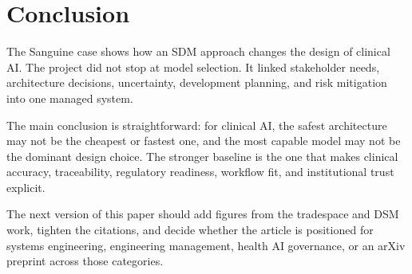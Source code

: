 \section{Conclusion}

The Sanguine case shows how an SDM approach changes the design of clinical AI. The project did not stop at model selection. It linked stakeholder needs, architecture decisions, uncertainty, development planning, and risk mitigation into one managed system.

The main conclusion is straightforward: for clinical AI, the safest architecture may not be the cheapest or fastest one, and the most capable model may not be the dominant design choice. The stronger baseline is the one that makes clinical accuracy, traceability, regulatory readiness, workflow fit, and institutional trust explicit.

The next version of this paper should add figures from the tradespace and DSM work, tighten the citations, and decide whether the article is positioned for systems engineering, engineering management, health AI governance, or an arXiv preprint across those categories.
